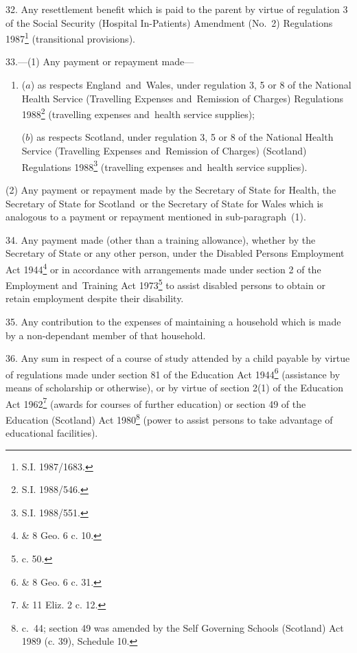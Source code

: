 \documentclass[12pt,a4paper]{article}
\begin{document}

\medskip

32.  Any resettlement benefit which is paid to the parent by virtue of regulation 3 of the Social Security (Hospital In-Patients) Amendment (No.\ 2) Regulations 1987\footnote{\frenchspacing S.I. 1987/1683.} (transitional provisions).

\medskip

33.—(1) Any payment or repayment made—
\begin{enumerate}\item[]
($a$) as respects England~and~Wales, under regulation 3, 5 or 8 of the National Health Service (Travelling Expenses and~Remission of Charges) Regulations 1988\footnote{\frenchspacing S.I. 1988/546.} (travelling expenses and~health service supplies);

($b$) as respects Scotland, under regulation 3, 5 or 8 of the National Health Service (Travelling Expenses and~Remission of Charges) (Scotland) Regulations 1988\footnote{\frenchspacing S.I. 1988/551.} (travelling expenses and~health service supplies).
\end{enumerate}

(2) Any payment or repayment made by the Secretary of State for Health, the Secretary of State for Scotland~or the Secretary of State for Wales which is analogous to a payment or repayment mentioned in sub-paragraph~(1).

\medskip

34.  Any payment made (other than a training allowance), whether by the Secretary of State or any other person, under the Disabled Persons Employment Act 1944\footnote{ \& 8 Geo. 6 c. 10.} or in accordance with arrangements made under section 2 of the Employment and~Training Act 1973\footnote{ c. 50.} to assist disabled persons to obtain or retain employment despite their disability.

\medskip

35.  Any contribution to the expenses of maintaining a household which is made by a non-dependant member of that household.

\medskip

36.  Any sum in respect of a course of study attended by a child payable by virtue of regulations made under section 81 of the Education Act 1944\footnote{ \& 8 Geo. 6 c. 31.} (assistance by means of scholarship or otherwise), or by virtue of section 2(1) of the Education Act 1962\footnote{ \& 11 Eliz. 2 c. 12.} (awards for courses of further education) or section 49 of the Education (Scotland) Act 1980\footnote{ c.~44; section 49 was amended by the Self Governing Schools (Scotland) Act 1989 (c. 39), Schedule 10.} (power to assist persons to take advantage of educational facilities).
\end{document}
